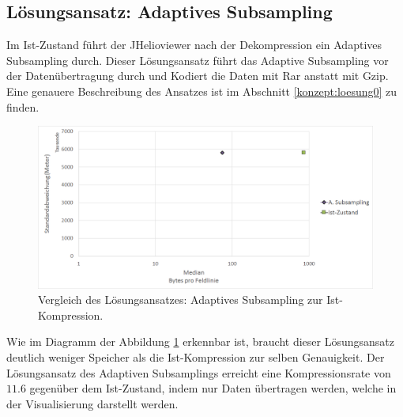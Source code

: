 \subsection{Lösungsansatz: Adaptives Subsampling} \label{resultate:loesung0}
Im Ist-Zustand führt der JHelioviewer nach der Dekompression ein Adaptives Subsampling durch. Dieser Lösungsansatz führt das Adaptive Subsampling vor der Datenübertragung durch und Kodiert die Daten mit Rar anstatt mit Gzip. Eine genauere Beschreibung des Ansatzes ist im Abschnitt \ref{konzept:loesung0} zu finden.

\begin{figure}[!htbp]
	\center
	\includegraphics[width=1\textwidth,keepaspectratio]{./pictures/resultate/loesung0/loesung0_0.png}
	\caption{Vergleich des Lösungsansatzes: Adaptives Subsampling zur Ist-Kompression.}
	\label{resultate:loesung0:loesung0_0}
\end{figure}
Wie im Diagramm der Abbildung \ref{resultate:loesung0:loesung0_0} erkennbar ist, braucht dieser Lösungsansatz deutlich weniger Speicher als die Ist-Kompression zur selben Genauigkeit. Der Lösungsansatz des Adaptiven Subsamplings erreicht eine Kompressionsrate von $11.6$ gegenüber dem Ist-Zustand, indem nur Daten übertragen werden, welche in der Visualisierung darstellt werden.

